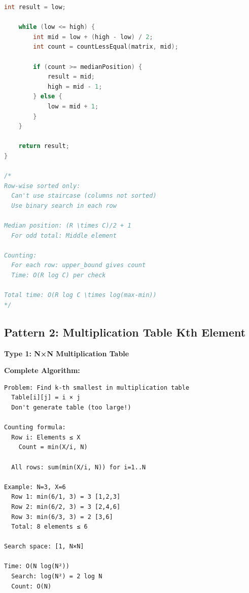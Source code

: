 \documentclass[11pt,a4paper,oneside]{book}
\begin{document}
\begin{lstlisting}[language=C++, caption=Complete Sorted Matrix Solutions]
    int result = low;
    
    while (low <= high) {
        int mid = low + (high - low) / 2;
        int count = countLessEqual(matrix, mid);
        
        if (count >= medianPosition) {
            result = mid;
            high = mid - 1;
        } else {
            low = mid + 1;
        }
    }
    
    return result;
}

/*
Row-wise sorted only:
  Can't use staircase (columns not sorted)
  Use binary search in each row

Median position: (R \times C)/2 + 1
  For odd total: Middle element

Counting:
  For each row: upper_bound gives count
  Time: O(R log C) per check

Total time: O(R log C \times log(max-min))
*/
\end{lstlisting}

\subsection{Pattern 2: Multiplication Table Kth Element}

\begin{tcolorbox}[
    enhanced,breakable,
    colback=lightgray,
    colframe=accentorange,
    boxrule=2pt,
    arc=4mm,
    title=\textbf{Complete Multiplication Table Algorithms}
]
\textbf{Type 1: N×N Multiplication Table}

\textbf{Complete Algorithm:}
\begin{verbatim}
Problem: Find k-th smallest in multiplication table
  Table[i][j] = i × j
  Don't generate table (too large!)
  
Counting formula:
  Row i: Elements ≤ X
    Count = min(X/i, N)
  
  All rows: sum(min(X/i, N)) for i=1..N

Example: N=3, X=6
  Row 1: min(6/1, 3) = 3 [1,2,3]
  Row 2: min(6/2, 3) = 3 [2,4,6]
  Row 3: min(6/3, 3) = 2 [3,6]
  Total: 8 elements ≤ 6

Search space: [1, N×N]

Time: O(N log(N²))
  Search: log(N²) = 2 log N
  Count: O(N)
\end{verbatim}
\end{tcolorbox}
\end{document}

